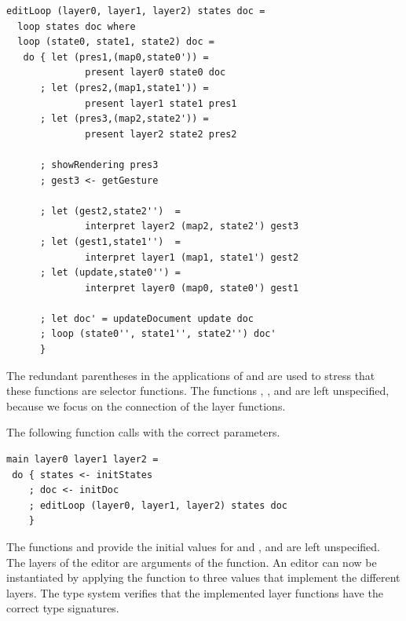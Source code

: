 \documentclass[preprint,natbib]{sigplanconf}
\begin{document}
\begin{small}
\begin{verbatim}
editLoop (layer0, layer1, layer2) states doc = 
  loop states doc where
  loop (state0, state1, state2) doc = 
   do { let (pres1,(map0,state0')) = 
              present layer0 state0 doc
      ; let (pres2,(map1,state1')) = 
              present layer1 state1 pres1
      ; let (pres3,(map2,state2')) = 
              present layer2 state2 pres2

      ; showRendering pres3
      ; gest3 <- getGesture

      ; let (gest2,state2'')  = 
              interpret layer2 (map2, state2') gest3
      ; let (gest1,state1'')  =
              interpret layer1 (map1, state1') gest2
      ; let (update,state0'') = 
              interpret layer0 (map0, state0') gest1
      
      ; let doc' = updateDocument update doc
      ; loop (state0'', state1'', state2'') doc'
      }
\end{verbatim}
\end{small}


The redundant parentheses in the applications of  and  are used to stress that these functions are selector functions. The functions , , and  are left unspecified, because we focus on the connection of the layer functions. 

The following function  calls  with the correct parameters.

\begin{small}
\begin{verbatim}
main layer0 layer1 layer2 = 
 do { states <- initStates
    ; doc <- initDoc 
    ; editLoop (layer0, layer1, layer2) states doc
    }
\end{verbatim}
\end{small}

The functions  and  provide the initial values for  and , and are left unspecified. The layers of the editor are arguments of the  function. An editor can now be instantiated by applying the function  to three  values that implement the different layers. The type system verifies that the implemented layer functions have the correct type signatures.
\end{document}
